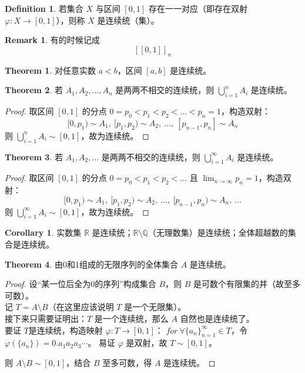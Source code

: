 \documentclass[oneside]{book}
\theoremstyle{definition}
\newtheorem{definition}{Definition}[section]
\newtheorem{theorem}{Theorem}[section]
\newtheorem{corollary}{Corollary}[section]
\newtheorem{remark}{Remark}[section]
\begin{document}
\begin{definition}
	若集合 \( X \) 与区间 \( [0,1] \) 存在一一对应（即存在双射 \( \varphi: X \to [0,1] \)），则称 \( X \) 是连续统（集）。
\end{definition}
\begin{remark}
	有的时候记成\[[[0,1]]_n\]
\end{remark}
\begin{theorem}
	对任意实数 \( a < b \)，区间 \( [a,b] \) 是连续统。
\end{theorem}

\begin{theorem}
	若 \( A_1, A_2, \dots, A_n \) 是两两不相交的连续统，则 \( \bigcup_{i=1}^n A_i \) 是连续统。
\end{theorem}

\begin{proof}
	取区间 \( [0,1] \) 的分点 \( 0 = p_0 < p_1 < p_2 < \dots < p_n = 1 \)，构造双射：
	\[
	[0,p_1) \sim A_1,\ [p_1,p_2) \sim A_2,\ \dots,\ [p_{n-1},p_n] \sim A_n
	\]
	则 \( \bigcup_{i=1}^n A_i \sim [0,1] \)，故为连续统。
\end{proof}

\begin{theorem}
	若 \( A_1, A_2, \dots \) 是两两不相交的连续统，则 \( \bigcup_{i=1}^\infty A_i \) 是连续统。
\end{theorem}

\begin{proof}
	取区间 \( [0,1] \) 的分点 \( 0 = p_0 < p_1 < p_2 < \dots \) 且 \( \lim_{n \to \infty} p_n = 1 \)，构造双射：
	\[
	[0,p_1) \sim A_1,\ [p_1,p_2) \sim A_2,\ \dots,\ [p_{n-1},p_n) \sim A_n,\ \dots
	\]
	则 \( \bigcup_{i=1}^\infty A_i \sim [0,1] \)，故为连续统。
\end{proof}

\begin{corollary}
	实数集 \( \mathbb{R} \) 是连续统；\( \mathbb{R} \setminus \mathbb{Q} \)（无理数集）是连续统；全体超越数的集合是连续统。
\end{corollary}

\begin{theorem}
	由0和1组成的无限序列的全体集合 \( A \) 是连续统。
\end{theorem}


\begin{proof}
	设“某一位后全为0的序列”构成集合 \( B \)，则 \( B \) 是可数个有限集的并（故至多可数）。\\
	记 \(T=A \setminus B \)（在这里应该说明 \(T\) 是一个无限集）。\\
	接下来只需要证明出：\(T\) 是一个连续统，那么 \(A\) 自然也是连续统了。\\
	要证 \( T \)是连续统，构造映射 \( \varphi: T \to [0,1] \)：
	 \( for\ \forall\{a_n\}_{n=1}^\infty \in T \)，令 \( \varphi(\{a_n\}) = 0.a_1a_2a_3\cdots \)。
	易证 \( \varphi \) 是双射，故 \( T \sim [0,1] \)。
	
	则 \( A \setminus B \sim [0,1] \)，结合 \( B \) 至多可数，得 \( A \) 是连续统。
\end{proof}
\end{document}
